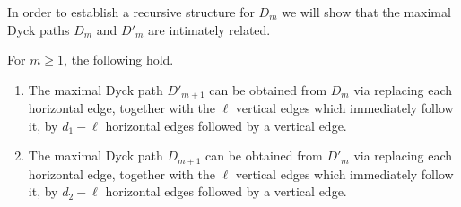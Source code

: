 In order to establish a recursive structure for $D_m$ we will show that the maximal Dyck paths $D_m$ and $D'_m$ are intimately related.
\begin{lemma}
 \label{le:Dyck path recursion}
 For $m\ge1$, the following hold.
 \begin{enumerate}[label=(\alph*)]
 \item\label{lemma2.3_1} The maximal Dyck path $D'_{m+1}$ can be obtained from $D_m$ via replacing each horizontal edge, together with the $\ell$ vertical edges which immediately follow it, by $d_1-\ell$ horizontal edges followed by a vertical edge.
 \item\label{lemma2.3_2} The maximal Dyck path $D_{m+1}$ can be obtained from $D'_m$ via replacing each horizontal edge, together with the $\ell$ vertical edges which immediately follow it, by $d_2-\ell$ horizontal edges followed by a vertical edge.
 \end{enumerate}
\end{lemma}
